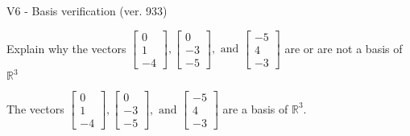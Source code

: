 \begin{exercise}
  \begin{exerciseTitle}V6 - Basis verification (ver. 933)\end{exerciseTitle}
  \begin{exerciseStatement}
    Explain why the vectors \(\left[\begin{array}{r}
0 \\
1 \\
-4
\end{array}\right] , \left[\begin{array}{r}
0 \\
-3 \\
-5
\end{array}\right] , \text{ and } \left[\begin{array}{r}
-5 \\
4 \\
-3
\end{array}\right]\) are or are not a basis of \(\mathbb{R}^3\)	


  \end{exerciseStatement}
  \begin{exerciseAnswer}
   The vectors \(\left[\begin{array}{r}
0 \\
1 \\
-4
\end{array}\right] , \left[\begin{array}{r}
0 \\
-3 \\
-5
\end{array}\right] , \text{ and } \left[\begin{array}{r}
-5 \\
4 \\
-3
\end{array}\right]\) 
  	 are  a basis of \(\mathbb{R}^3\).
  


  \end{exerciseAnswer}
\end{exercise}